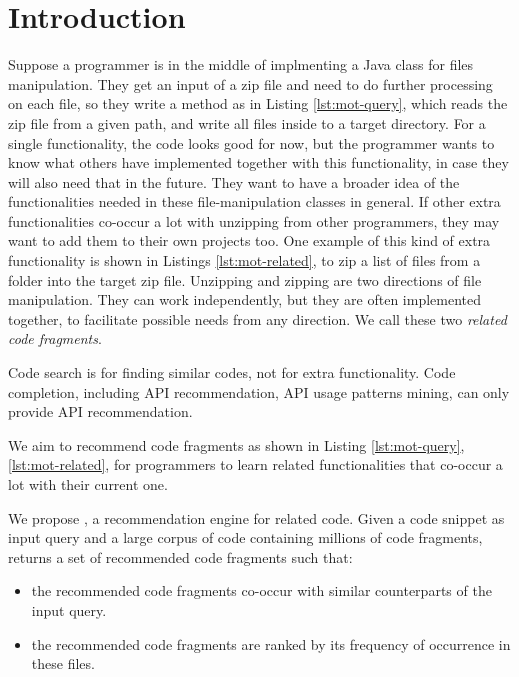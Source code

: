 \section{Introduction}
\label{sec:intro}



Suppose a programmer is in the middle of implmenting a Java class for files manipulation. They get an input of a zip file and need to do further processing on each file, so they write a method as in Listing \ref{lst:mot-query}, which reads the zip file from a given path, and write all files inside to a target directory. For a single functionality, the code looks good for now, but the programmer wants to know what others have implemented together with this functionality, in case they will also need that in the future. They want to have a broader idea of the functionalities needed in these file-manipulation classes in general. If other extra functionalities co-occur a lot with unzipping from other programmers, they may want to add them to their own projects too. One example of this kind of extra functionality is shown in Listings \ref{lst:mot-related}, to zip a list of files from a folder into the target zip file. Unzipping and zipping are two directions of file manipulation. They can work independently, but they are often implemented together, to facilitate possible needs from any direction. We call these two \textit{related code fragments}.


Code search is for finding similar codes, not for extra functionality. Code completion, including API recommendation, API usage patterns mining, can only provide API recommendation. 

We aim to recommend code fragments as shown in Listing \ref{lst:mot-query}, \ref{lst:mot-related}, for programmers to learn related functionalities that co-occur a lot with their current one.

We propose {\tool}, a recommendation engine for related code. Given a code snippet as input query and a large corpus of code containing millions of code fragments, {\tool} returns a set of recommended code fragments such that:
\begin{itemize}
	\item the recommended code fragments co-occur with similar counterparts of the input query.
	\item the recommended code fragments are ranked by its frequency of occurrence in these files.
\end{itemize}


